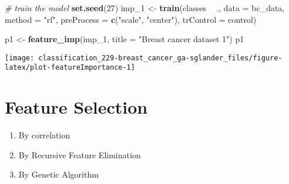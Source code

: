 \documentclass[]{book}
\newenvironment{Shaded}{\begin{snugshade}}{\end{snugshade}}
\newcommand{\CommentTok}[1]{\textcolor[rgb]{0.56,0.35,0.01}{\textit{#1}}}
\newcommand{\DataTypeTok}[1]{\textcolor[rgb]{0.13,0.29,0.53}{#1}}
\newcommand{\DecValTok}[1]{\textcolor[rgb]{0.00,0.00,0.81}{#1}}
\newcommand{\FloatTok}[1]{\textcolor[rgb]{0.00,0.00,0.81}{#1}}
\newcommand{\KeywordTok}[1]{\textcolor[rgb]{0.13,0.29,0.53}{\textbf{#1}}}
\newcommand{\NormalTok}[1]{#1}
\newcommand{\OperatorTok}[1]{\textcolor[rgb]{0.81,0.36,0.00}{\textbf{#1}}}
\newcommand{\OtherTok}[1]{\textcolor[rgb]{0.56,0.35,0.01}{#1}}
\newcommand{\StringTok}[1]{\textcolor[rgb]{0.31,0.60,0.02}{#1}}
\providecommand{\tightlist}{%
  \setlength{\itemsep}{0pt}\setlength{\parskip}{0pt}}
\begin{document}
\begin{Shaded}
\begin{Highlighting}[]
\CommentTok{# train the model}
\KeywordTok{set.seed}\NormalTok{(}\DecValTok{27}\NormalTok{)}
\NormalTok{imp_}\DecValTok{1}\NormalTok{ <-}\StringTok{ }\KeywordTok{train}\NormalTok{(classes }\OperatorTok{~}\StringTok{ }\NormalTok{., }\DataTypeTok{data =}\NormalTok{ bc_data, }\DataTypeTok{method =} \StringTok{"rf"}\NormalTok{, }
               \DataTypeTok{preProcess =} \KeywordTok{c}\NormalTok{(}\StringTok{"scale"}\NormalTok{, }\StringTok{"center"}\NormalTok{), }
               \DataTypeTok{trControl =}\NormalTok{ control)}
\end{Highlighting}
\end{Shaded}

\begin{Shaded}
\begin{Highlighting}[]
\NormalTok{p1 <-}\StringTok{ }\KeywordTok{feature_imp}\NormalTok{(imp_}\DecValTok{1}\NormalTok{, }\DataTypeTok{title =} \StringTok{"Breast cancer dataset 1"}\NormalTok{)}
\NormalTok{p1}
\end{Highlighting}
\end{Shaded}

\begin{center}\texttt{[image: classification\_229-breast\_cancer\_ga-sglander\_files/figure-latex/plot-featureImportance-1]} \end{center}

\hypertarget{feature-selection}{%
\section{Feature Selection}\label{feature-selection}}

\begin{enumerate}
\def\labelenumi{\arabic{enumi}.}
\tightlist
\item
  By correlation
\item
  By Recursive Feature Elimination
\item
  By Genetic Algorithm
\end{enumerate}

\begin{Shaded}
\end{Shaded}
\end{document}
